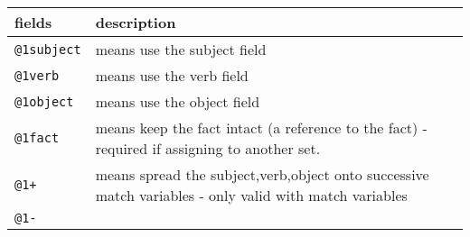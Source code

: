 \documentclass[]{article}
\begin{document}
\begin{longtable}[]{@{}ll@{}}
\toprule
\begin{minipage}[b]{0.18\columnwidth}\raggedright\strut
fields\strut
\end{minipage} & \begin{minipage}[b]{0.16\columnwidth}\raggedright\strut
description\strut
\end{minipage}\tabularnewline
\midrule
\endhead
\begin{minipage}[t]{0.18\columnwidth}\raggedright\strut
\texttt{@1subject}\strut
\end{minipage} & \begin{minipage}[t]{0.16\columnwidth}\raggedright\strut
means use the subject field\strut
\end{minipage}\tabularnewline
\begin{minipage}[t]{0.18\columnwidth}\raggedright\strut
\texttt{@1verb}\strut
\end{minipage} & \begin{minipage}[t]{0.16\columnwidth}\raggedright\strut
means use the verb field\strut
\end{minipage}\tabularnewline
\begin{minipage}[t]{0.18\columnwidth}\raggedright\strut
\texttt{@1object}\strut
\end{minipage} & \begin{minipage}[t]{0.16\columnwidth}\raggedright\strut
means use the object field\strut
\end{minipage}\tabularnewline
\begin{minipage}[t]{0.18\columnwidth}\raggedright\strut
\texttt{@1fact}\strut
\end{minipage} & \begin{minipage}[t]{0.16\columnwidth}\raggedright\strut
means keep the fact intact (a reference to the fact) - required if
assigning to another set.\strut
\end{minipage}\tabularnewline
\begin{minipage}[t]{0.18\columnwidth}\raggedright\strut
\texttt{@1+}\strut
\end{minipage} & \begin{minipage}[t]{0.16\columnwidth}\raggedright\strut
means spread the subject,verb,object onto successive match variables -
only valid with match variables\strut
\end{minipage}\tabularnewline
\begin{minipage}[t]{0.18\columnwidth}\raggedright\strut
\texttt{@1-}\strut
\end{minipage} & \begin{minipage}[t]{0.16\columnwidth}\raggedright\strut

\end{minipage}
\end{longtable}
\end{document}
